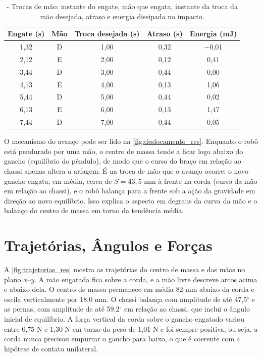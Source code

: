 \begin{table}[H]
\centering
\caption{\label{tab:trocas}- Trocas de mão: instante do engate, mão que engata, instante da troca da mão desejada, atraso e energia dissipada no impacto.}
\vspace*{.1cm}
\begin{tabular}{|c|c|c|c|c|}
\hline
\textbf{Engate (s)} & \textbf{Mão} & \textbf{Troca desejada (s)} & \textbf{Atraso (s)} & \textbf{Energia (mJ)} \\
\hline
1,32 & D & 1,00 & 0,32 & $-$0,01 \\
\hline
2,12 & E & 2,00 & 0,12 & 0,41 \\
\hline
3,44 & D & 3,00 & 0,44 & 0,00 \\
\hline
4,13 & E & 4,00 & 0,13 & 1,06 \\
\hline
5,44 & D & 5,00 & 0,44 & 0,02 \\
\hline
6,13 & E & 6,00 & 0,13 & 1,47 \\
\hline
7,44 & D & 7,00 & 0,44 & 0,05 \\
\hline
\end{tabular}
\end{table}

O mecanismo do avanço pode ser lido na \ref{fig:deslocamento_res}. Enquanto o robô está pendurado por uma mão, o centro de massa tende a ficar logo abaixo do gancho (equilíbrio do pêndulo), de modo que o curso do braço em relação ao chassi apenas altera a arfagem. É na troca de mão que o avanço ocorre: o novo gancho engata, em média, cerca de $S=43,5$ mm à frente na corda (curso da mão em relação ao chassi), e o robô balança para a frente sob a ação da gravidade em direção ao novo equilíbrio. Isso explica o aspecto em degraus da curva da mão e o balanço do centro de massa em torno da tendência média.

\section{Trajetórias, Ângulos e Forças}
\label{sec:res_traj}

A \ref{fig:trajetorias_res} mostra as trajetórias do centro de massa e das mãos no plano $x$--$y$. A mão engatada fica sobre a corda, e a mão livre descreve arcos acima e abaixo dela. O centro de massa permanece em média 82 mm abaixo da corda e oscila verticalmente por 18,0 mm. O chassi balança com amplitude de até 47,5$^\circ$ e as pernas, com amplitude de até 59,2$^\circ$ em relação ao chassi, que inclui o ângulo inicial de equilíbrio. A força vertical da corda sobre o gancho engatado variou entre 0,75 N e 1,30 N em torno do peso de 1,01 N e foi sempre positiva, ou seja, a corda nunca precisou empurrar o gancho para baixo, o que é coerente com a hipótese de contato unilateral.

